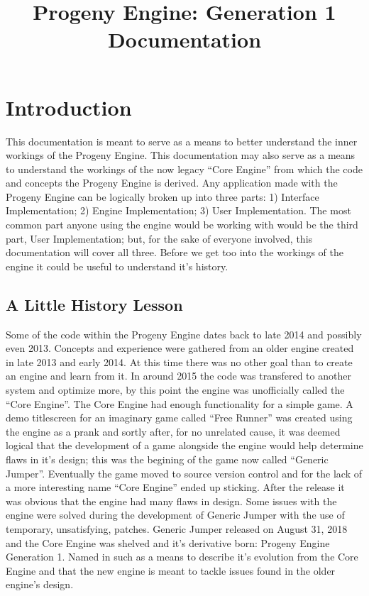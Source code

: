 \documentclass[12pt]{article}
\begin{document}
\title{Progeny Engine: Generation 1\\ Documentation}
\iffalse
\author{Sasha C. Gervais-Tourangeau}
\fi
\maketitle

\section{Introduction}
This documentation is meant to serve as a means to better understand the inner workings of the Progeny Engine.
This documentation may also serve as a means to understand the workings of the now legacy ``Core Engine'' from which the code and concepts the Progeny Engine is derived. Any application made with the Progeny Engine can be logically broken up into three parts: 1) Interface Implementation; 2) Engine Implementation; 3) User Implementation. The most common part anyone using the engine would be working with would be the third part, User Implementation; but, for the sake of everyone involved, this documentation will cover all three. Before we get too into the workings of the engine it could be useful to understand it's history.

\subsection{A Little History Lesson}
Some of the code within the Progeny Engine dates back to late 2014 and possibly even 2013. Concepts and experience were gathered from an older engine created in late 2013 and early 2014. At this time there was no other goal than to create an engine and learn from it. In around 2015 the code was transfered to another system and optimize more, by this point the engine was unofficially called the ``Core Engine''. The Core Engine had enough functionality for a simple game. A demo titlescreen for an imaginary game called ``Free Runner'' was created using the engine as a prank and sortly after, for no unrelated cause, it was deemed logical that the development of a game alongside the engine would help determine flaws in it's design; this was the begining of the game now called ``Generic Jumper''. Eventually the game moved to source version control and for the lack of a more interesting name ``Core Engine'' ended up sticking. After the release it was obvious that the engine had many flaws in design. Some issues with the engine were solved during the development of Generic Jumper with the use of temporary, unsatisfying, patches. Generic Jumper released on August 31, 2018 and the Core Engine was shelved and it's derivative born: Progeny Engine Generation 1. Named in such as a means to describe it's evolution from the Core Engine and that the new engine is meant to tackle issues found in the older engine's design.
\end{document}
